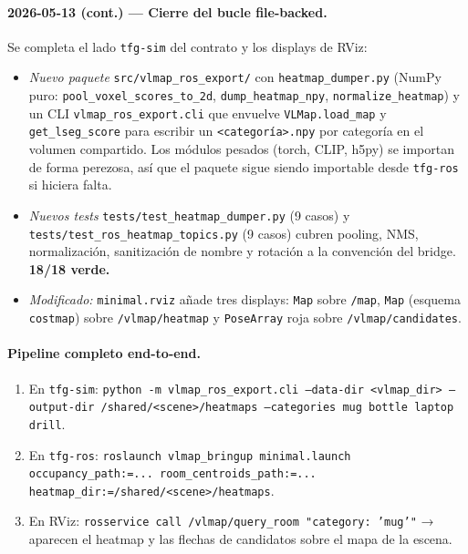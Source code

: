 \documentclass[11pt,a4paper]{article}
\begin{document}
\paragraph{2026-05-13 (cont.) — Cierre del bucle file-backed.}

Se completa el lado \texttt{tfg-sim} del contrato y los displays de RViz:

\begin{itemize}
  \item \emph{Nuevo paquete} \texttt{src/vlmap\_ros\_export/} con
        \texttt{heatmap\_dumper.py} (NumPy puro: \texttt{pool\_voxel\_scores\_to\_2d},
        \texttt{dump\_heatmap\_npy}, \texttt{normalize\_heatmap}) y un CLI
        \texttt{vlmap\_ros\_export.cli} que envuelve
        \texttt{VLMap.load\_map} y \texttt{get\_lseg\_score} para escribir
        un \texttt{<categoría>.npy} por categoría en el volumen compartido.
        Los módulos pesados (torch, CLIP, h5py) se importan de forma
        perezosa, así que el paquete sigue siendo importable desde
        \texttt{tfg-ros} si hiciera falta.
  \item \emph{Nuevos tests} \texttt{tests/test\_heatmap\_dumper.py} (9
        casos) y \texttt{tests/test\_ros\_heatmap\_topics.py} (9 casos)
        cubren pooling, NMS, normalización, sanitización de nombre y
        rotación a la convención del bridge. \textbf{18/18 verde.}
  \item \emph{Modificado:} \texttt{minimal.rviz} añade tres displays:
        \texttt{Map} sobre \texttt{/map}, \texttt{Map} (esquema
        \texttt{costmap}) sobre \texttt{/vlmap/heatmap} y \texttt{PoseArray}
        roja sobre \texttt{/vlmap/candidates}.
\end{itemize}

\paragraph{Pipeline completo end-to-end.}

\begin{enumerate}
  \item En \texttt{tfg-sim}: \texttt{python -m vlmap\_ros\_export.cli
        --data-dir <vlmap\_dir> --output-dir /shared/<scene>/heatmaps
        --categories mug bottle laptop drill}.
  \item En \texttt{tfg-ros}:
        \texttt{roslaunch vlmap\_bringup minimal.launch
        occupancy\_path:=... room\_centroids\_path:=...
        heatmap\_dir:=/shared/<scene>/heatmaps}.
  \item En RViz: \texttt{rosservice call /vlmap/query\_room "category:
        'mug'"} → aparecen el heatmap y las flechas de candidatos sobre el
        mapa de la escena.
\end{enumerate}
\end{document}
